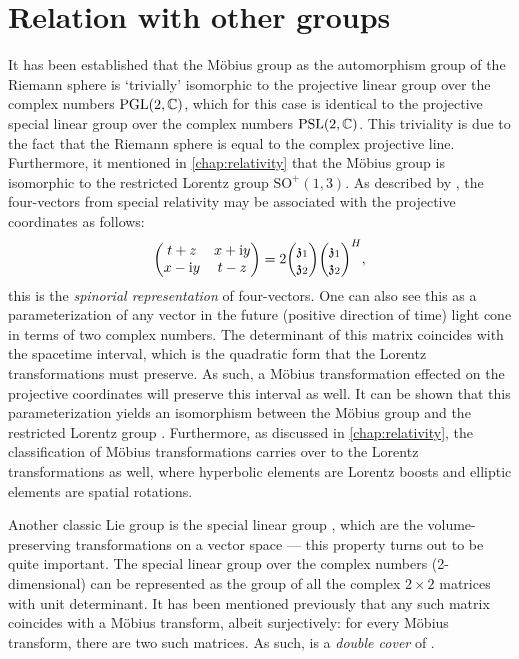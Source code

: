 \section{Relation with other groups}
It has been established that the Möbius group as the automorphism group of the Riemann sphere is `trivially' isomorphic to the projective linear group over the complex numbers $\mathrm{PGL}(2, \mathbb{C})$, which for this case is identical to the projective special linear group over the complex numbers $\mathrm{PSL}(2, \mathbb{C})$. This triviality is due to the fact that the Riemann sphere is equal to the complex projective line. Furthermore, it mentioned in \cref{chap:relativity} that the Möbius group is isomorphic to the restricted Lorentz group $\text{SO}^+(1,3)$. As described by \citet{Needham2021}, the four-vectors from special relativity may be associated with the projective coordinates as follows:
$$
    \mqty(t + z & x + \ii y\\ x - \ii y & t - z) = 2 \mqty(\mathfrak{z}_1 \\ \mathfrak{z}_2)\mqty(\mathfrak{z}_1 \\ \mathfrak{z}_2)^H,
$$
this is the \emph{spinorial representation} of four-vectors. One can also see this as a parameterization of any vector in the future (positive direction of time) light cone in terms of two complex numbers. The determinant of this matrix coincides with the spacetime interval, which is the quadratic form that the Lorentz transformations must preserve. As such, a Möbius transformation effected on the projective coordinates will preserve this interval as well. It can be shown that this parameterization yields an isomorphism between the Möbius group and the restricted Lorentz group \cite{Penrose1984}. Furthermore, as discussed in \cref{chap:relativity}, the classification of Möbius transformations carries over to the Lorentz transformations as well, where hyperbolic elements are Lorentz boosts and elliptic elements are spatial rotations.

Another classic Lie group is the special linear group , which are the volume-preserving transformations on a vector space --- this property turns out to be quite important. The special linear group over the complex numbers (2-dimensional)  can be represented as the group of all the complex \(2\times2\) matrices with unit determinant. It has been mentioned previously that any such matrix coincides with a Möbius transform, albeit surjectively: for every Möbius transform, there are two such matrices. As such,  is a \emph{double cover} of \moebiusgroup.

